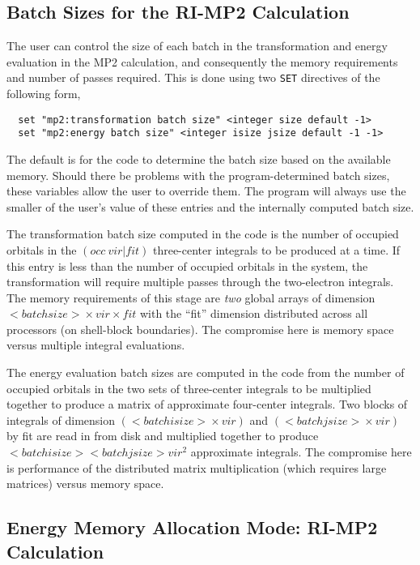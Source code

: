 \subsection{Batch Sizes for the RI-MP2 Calculation}

The user can control the size of each batch in the transformation and
energy evaluation in the MP2 calculation, and consequently the memory
requirements and number of passes required.  This is done using two
\verb+SET+ directives of the following form,

\begin{verbatim}
  set "mp2:transformation batch size" <integer size default -1>
  set "mp2:energy batch size" <integer isize jsize default -1 -1>
\end{verbatim}

The default is for the code to determine the batch size based on the
available memory.  Should there be problems with the
program-determined batch sizes, these variables allow the user to
override them.  The program will always use the smaller of the user's
value of these entries and the internally computed batch size.

The transformation batch size computed in the code is the number of
occupied orbitals in the $({occ}\ {vir} | {fit})$ three-center
integrals to be produced at a time.  If this entry is less than the
number of occupied orbitals in the system, the transformation will
require multiple passes through the two-electron integrals.  The
memory requirements of this stage are {\em two} global arrays of
dimension ${<batch size>}\times {vir} \times {fit}$ with the ``fit''
dimension distributed across all processors (on shell-block
boundaries).  The compromise here is memory space versus multiple
integral evaluations.

The energy evaluation batch sizes are computed in the code from the
number of occupied orbitals in the two sets of three-center
integrals to be multiplied together to produce a matrix of approximate
four-center integrals.  Two blocks of integrals of dimension $({<batch
  isize>}\times {vir})$ and $({<batch jsize>}\times {vir})$ by fit are
read in from disk and multiplied together to produce $<batch isize>
<batch jsize> {vir}^2$ approximate integrals.  The compromise here is
performance of the distributed matrix multiplication (which requires
large matrices) versus memory space.

\subsection{Energy Memory Allocation Mode: RI-MP2 Calculation}

